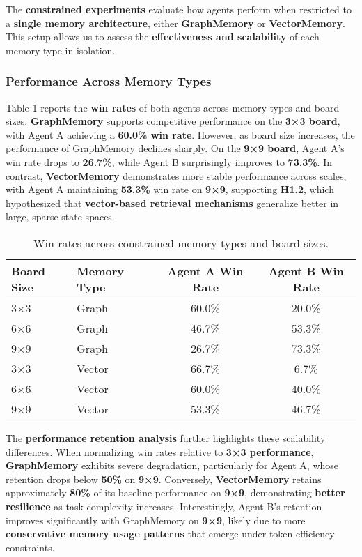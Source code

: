 \documentclass[12pt]{article}
\begin{document}
The \textbf{constrained experiments} evaluate how agents perform when restricted to a \textbf{single memory architecture}, either \textbf{GraphMemory} or \textbf{VectorMemory}. This setup allows us to assess the \textbf{effectiveness and scalability} of each memory type in isolation.

\subsubsection{Performance Across Memory Types}

Table 1 reports the \textbf{win rates} of both agents across memory types and board sizes. \textbf{GraphMemory} supports competitive performance on the \textbf{3×3 board}, with Agent A achieving a \textbf{60.0\% win rate}. However, as board size increases, the performance of GraphMemory declines sharply. On the \textbf{9×9 board}, Agent A's win rate drops to \textbf{26.7\%}, while Agent B surprisingly improves to \textbf{73.3\%}. In contrast, \textbf{VectorMemory} demonstrates more stable performance across scales, with Agent A maintaining \textbf{53.3\%} win rate on \textbf{9×9}, supporting \textbf{H1.2}, which hypothesized that \textbf{vector-based retrieval mechanisms} generalize better in large, sparse state spaces.

\begin{table}
\centering
\caption{Win rates across constrained memory types and board sizes.}
\begin{tabular}{llcc}
\hline
Board Size & Memory Type & Agent A Win Rate & Agent B Win Rate \\
\hline
3×3 & Graph & 60.0\% & 20.0\% \\
6×6 & Graph & 46.7\% & 53.3\% \\
9×9 & Graph & 26.7\% & 73.3\% \\
3×3 & Vector & 66.7\% & 6.7\% \\
6×6 & Vector & 60.0\% & 40.0\% \\
9×9 & Vector & 53.3\% & 46.7\% \\
\hline
\end{tabular}
\end{table}

The \textbf{performance retention analysis} further highlights these scalability differences. When normalizing win rates relative to \textbf{3×3 performance}, \textbf{GraphMemory} exhibits severe degradation, particularly for Agent A, whose retention drops below \textbf{50\%} on \textbf{9×9}. Conversely, \textbf{VectorMemory} retains approximately \textbf{80\%} of its baseline performance on \textbf{9×9}, demonstrating \textbf{better resilience} as task complexity increases. Interestingly, Agent B's retention improves significantly with GraphMemory on \textbf{9×9}, likely due to more \textbf{conservative memory usage patterns} that emerge under token efficiency constraints.
\end{document}
